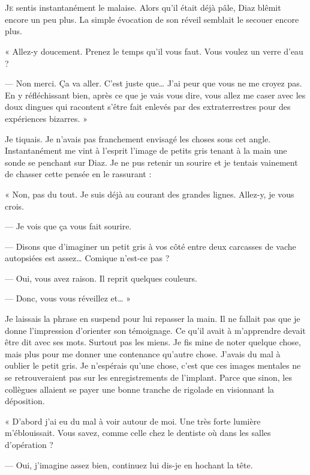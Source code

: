 \chapter{}

\lettrine[lines=1]{J}{e} sentis instantanément le malaise. Alors qu'il était déjà pâle, Diaz blêmit encore un peu plus.
La simple évocation de son réveil semblait le secouer encore plus.

« Allez-y doucement. Prenez le temps qu'il vous faut. Vous voulez un verre d'eau ?

— Non merci. Ça va aller. C'est juste que… J'ai peur que vous ne me croyez pas. En y réfléchissant bien, après ce que
je vais vous dire, vous allez me caser avec les doux dingues qui racontent s'être fait enlevés par des extraterrestres
pour des expériences bizarres. »

Je tiquais. Je n'avais pas franchement envisagé les choses sous cet angle. Instantanément me vint à l'esprit l'image de
petits gris tenant à la main une sonde se penchant sur Diaz. Je ne pus retenir un sourire et je tentais vainement de
chasser cette pensée en le rassurant :

« Non, pas du tout. Je suis déjà au courant des grandes lignes. Allez-y, je vous crois.

— Je vois que ça vous fait sourire.

— Disons que d'imaginer un petit gris à vos côté entre deux carcasses de vache autopsiées est assez… Comique n'est-ce
pas ?

— Oui, vous avez raison. Il reprit quelques couleurs.

— Donc, vous vous réveillez et… »

Je laissais la phrase en suspend pour lui repasser la main. Il ne fallait pas que je donne l'impression d'orienter son
témoignage. Ce qu'il avait à m'apprendre devait être dit avec ses mots. Surtout pas les miens. Je fis mine de noter
quelque chose, mais plus pour me donner une contenance qu'autre chose. J'avais du mal à oublier le petit gris. Je
n'espérais qu'une chose, c'est que ces images mentales ne se retrouveraient pas sur les enregistrements de l'implant.
Parce que sinon, les collègues allaient se payer une bonne tranche de rigolade en visionnant la déposition.

« D'abord j'ai eu du mal à voir autour de moi. Une très forte lumière m'éblouissait. Vous savez, comme celle chez le
dentiste où dans les salles d'opération ?

— Oui, j'imagine assez bien, continuez lui dis-je en hochant la tête.

